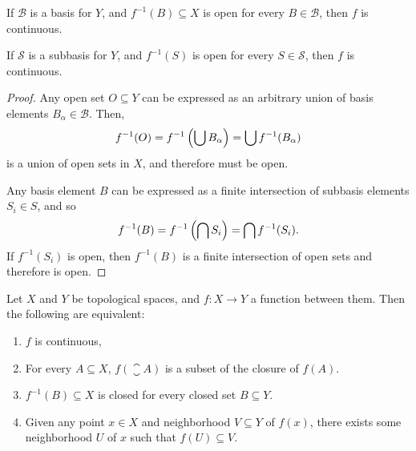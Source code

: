 \begin{lemma}
    If $\mathcal{B}$ is a basis for $Y$, and $f^{-1}(B) \subseteq X$ is open for every $B \in \mathcal{B}$, then $f$ is continuous.

    If $\mathcal{S}$ is a subbasis for $Y$, and $f^{-1}(S)$ is open for every $S \in \mathcal{S}$, then $f$ is continuous.
\end{lemma}

\begin{proof}
    Any open set $O \subseteq Y$ can be expressed as an arbitrary union of basis elements $B_{\alpha} \in \mathcal{B}$. Then,
    \begin{align*}
        f^{-1}(O) = f^{-1}\left(\bigcup B_{\alpha}\right) = \bigcup f^{-1}(B_{\alpha})
    \end{align*}
    is a union of open sets in $X$, and therefore must be open.

    Any basis element $B$ can be expressed as a finite intersection of subbasis elements $S_{i} \in S$, and so
    \begin{align*}
        f^{-1}(B) = f^{-1}\left(\bigcap S_{i}\right) = \bigcap f^{-1}(S_i).
    \end{align*}
    If $f^{-1}(S_i)$ is open, then $f^{-1}(B)$ is a finite intersection of open sets and therefore is open.
\end{proof}

\begin{thm} Let $X$ and $Y$ be topological spaces, and $f: X \to Y$ a function between them. Then the following are equivalent:
    \begin{enumerate}[label=(\arabic*)]
        \item $f$ is continuous,
        \item For every $A \subseteq X$, $f(\closure{A})$ is a subset of the closure of $f(A)$.
        \item $f^{-1}(B) \subseteq X$ is closed for every closed set $B \subseteq Y$.
        \item Given any point $x \in X$ and neighborhood $V \subseteq Y$ of $f(x)$, there exists some neighborhood $U$ of $x$ such that $f(U) \subseteq V$.
    \end{enumerate}
\end{thm}

